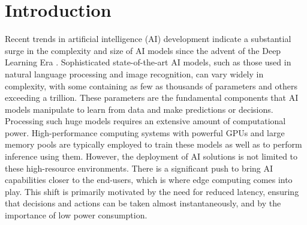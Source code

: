 \chapter{Introduction}
Recent trends in artificial intelligence (AI) development indicate a substantial surge in the complexity and size of AI models since the advent of the Deep Learning Era \cite{EpochDatabaseVisualization}.
Sophisticated state-of-the-art AI models, such as those used in natural language processing and image recognition, can vary widely in complexity, with some containing as few as thousands of parameters and others exceeding a trillion.
These parameters are the fundamental components that AI models manipulate to learn from data and make predictions or decisions.
Processing such huge models requires an extensive amount of computational power.
High-performance computing systems with powerful GPUs and large memory pools are typically employed to train these models as well as to perform inference using them.
However, the deployment of AI solutions is not limited to these high-resource environments.
There is a significant push to bring AI capabilities closer to the end-users, which is where edge computing comes into play.
This shift is primarily motivated by the need for reduced latency, ensuring that decisions and actions can be taken almost instantaneously, and by the importance of low power consumption.


